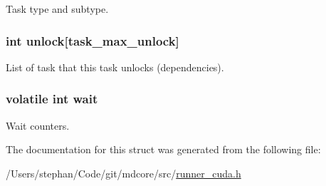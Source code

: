 Task type and subtype. \hypertarget{structtask__cuda_a04f8c77b785d7085535af360c3b3604f}{
\subsubsection[{unlock}]{\setlength{\rightskip}{0pt plus 5cm}int unlock\mbox{[}{\bf task\-\_\-max\-\_\-unlock}\mbox{]}}}\label{structtask__cuda_a04f8c77b785d7085535af360c3b3604f}
List of task that this task unlocks (dependencies). \hypertarget{structtask__cuda_aa94a6aba3d992ae3ac145f984ceb2eb9}{
\subsubsection[{wait}]{\setlength{\rightskip}{0pt plus 5cm}volatile int wait}}\label{structtask__cuda_aa94a6aba3d992ae3ac145f984ceb2eb9}
Wait counters. 

The documentation for this struct was generated from the following file\-:\begin{DoxyCompactItemize}
\item 
/\-Users/stephan/\-Code/git/mdcore/src/\hyperlink{runner__cuda_8h}{runner\-\_\-cuda.\-h}\end{DoxyCompactItemize}
